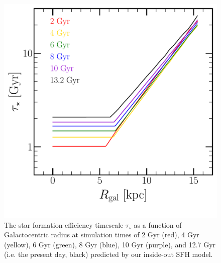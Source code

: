 \documentclass[fleqn, usenatbib]{mnras}
\begin{document}
\begin{figure} 
\centering 
\includegraphics[scale = 0.6]{sfe.pdf} 
\caption{The star formation efficiency timescale $\tau_\star$ as a 
function of Galactocentric radius at simulation times of 2 Gyr (red), 4 Gyr 
(yellow), 6 Gyr (green), 8 Gyr (blue), 10 Gyr (purple), and 12.7 Gyr (i.e. 
the present day, black) predicted by our inside-out SFH model. }
\label{fig:sfe} 
\end{figure} 
\end{document}
